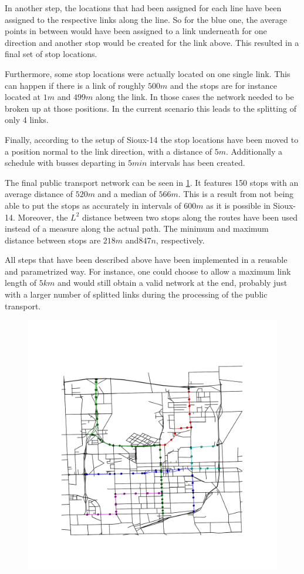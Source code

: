 In another step, the locations that had been assigned for each line have been
assigned to the respective links along the line. So for the blue one, the average
points in between would have been assigned to a link underneath for one direction
and another stop would be created for the link above. This resulted in a final
set of stop locations.

Furthermore, some stop locations were actually located on one single link. This
can happen if there is a link of roughly $500m$ and the stops are for instance
located at $1m$ and $499m$ along the link. In those cases the network needed to
be broken up at those positions. In the current scenario this leads to the splitting
of only 4 links.

Finally, according to the setup of Sioux-14 the stop locations have been moved
to a position normal to the link direction, with a distance of $5m$. Additionally
a schedule with busses departing in $5min$ intervals has been created.

The final public transport network can be seen in \cref{fig:pt_network}. It features
150 stops with an average distance of $520m$ and a median of $566m$. This is a
result from not being able to put the stops as accurately in intervals of $600m$
as it is possible in Sioux-14. Moreover, the $L^2$ distance between two stops along
the routes have been used instead of a measure along the actual path. The minimum
and maximum distance between stops are $218m$ and$847n$, respectively.

All steps that have been described above have been implemented in a reusable and
parametrized way. For instance, one could choose to allow a maximum link length of
$5km$ and would still obtain a valid network at the end, probably just with a larger
number of splitted links during the processing of the public transport.

\begin{figure}
    \centering
    \includegraphics[width=1.0\textwidth]{figures/pt_network.pdf}
    \caption{}
    \label{fig:pt_network}
\end{figure}
